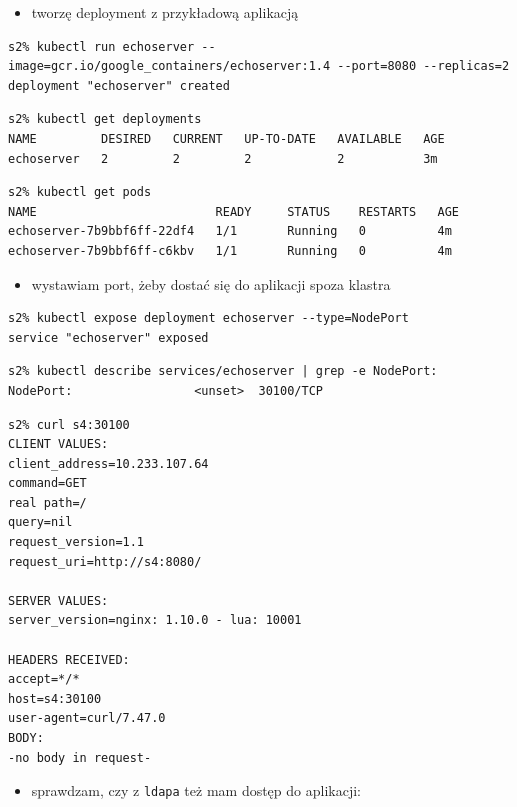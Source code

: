 \documentclass[a4paper,12pt,twoside,openany]{report}
\providecommand{\tightlist}{%
  \setlength{\itemsep}{0pt}\setlength{\parskip}{0pt}}
\newcommand{\passthrough}[1]{#1}
\begin{document}
\begin{itemize}
\tightlist
\item
  tworzę deployment z przykładową aplikacją
\end{itemize}

\begin{lstlisting}
s2% kubectl run echoserver --image=gcr.io/google_containers/echoserver:1.4 --port=8080 --replicas=2
deployment "echoserver" created
\end{lstlisting}

\begin{lstlisting}
s2% kubectl get deployments
NAME         DESIRED   CURRENT   UP-TO-DATE   AVAILABLE   AGE
echoserver   2         2         2            2           3m
\end{lstlisting}

\begin{lstlisting}
s2% kubectl get pods
NAME                         READY     STATUS    RESTARTS   AGE
echoserver-7b9bbf6ff-22df4   1/1       Running   0          4m
echoserver-7b9bbf6ff-c6kbv   1/1       Running   0          4m
\end{lstlisting}

\begin{itemize}
\tightlist
\item
  wystawiam port, żeby dostać się do aplikacji spoza klastra
\end{itemize}

\begin{lstlisting}
s2% kubectl expose deployment echoserver --type=NodePort
service "echoserver" exposed
\end{lstlisting}

\begin{lstlisting}
s2% kubectl describe services/echoserver | grep -e NodePort:
NodePort:                 <unset>  30100/TCP
\end{lstlisting}

\begin{lstlisting}
s2% curl s4:30100
CLIENT VALUES:
client_address=10.233.107.64
command=GET
real path=/
query=nil
request_version=1.1
request_uri=http://s4:8080/

SERVER VALUES:
server_version=nginx: 1.10.0 - lua: 10001

HEADERS RECEIVED:
accept=*/*
host=s4:30100
user-agent=curl/7.47.0
BODY:
-no body in request-
\end{lstlisting}

\begin{itemize}
\tightlist
\item
  sprawdzam, czy z \passthrough{\lstinline!ldapa!} też mam dostęp do
  aplikacji:
\end{itemize}
\end{document}
